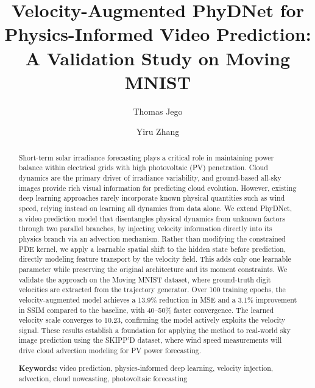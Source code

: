 \documentclass[11pt,a4paper]{article}
\title{\textbf{Velocity-Augmented PhyDNet for Physics-Informed Video Prediction:\\A Validation Study on Moving MNIST}}
\author[1]{Thomas Jego}
\author[2]{Yiru Zhang}
\affil[1]{Affiliation of Thomas Jego}
\affil[2]{Affiliation of Yiru Zhang}
\date{}
\begin{document}
\maketitle

\begin{abstract}
\noindent
Short-term solar irradiance forecasting plays a critical role in maintaining power balance within electrical grids with high photovoltaic (PV) penetration. Cloud dynamics are the primary driver of irradiance variability, and ground-based all-sky images provide rich visual information for predicting cloud evolution. However, existing deep learning approaches rarely incorporate known physical quantities such as wind speed, relying instead on learning all dynamics from data alone. We extend PhyDNet, a video prediction model that disentangles physical dynamics from unknown factors through two parallel branches, by injecting velocity information directly into its physics branch via an advection mechanism. Rather than modifying the constrained PDE kernel, we apply a learnable spatial shift to the hidden state before prediction, directly modeling feature transport by the velocity field. This adds only one learnable parameter while preserving the original architecture and its moment constraints. We validate the approach on the Moving MNIST dataset, where ground-truth digit velocities are extracted from the trajectory generator. Over 100 training epochs, the velocity-augmented model achieves a 13.9\% reduction in MSE and a 3.1\% improvement in SSIM compared to the baseline, with 40--50\% faster convergence. The learned velocity scale converges to 10.23, confirming the model actively exploits the velocity signal. These results establish a foundation for applying the method to real-world sky image prediction using the SKIPP'D dataset, where wind speed measurements will drive cloud advection modeling for PV power forecasting.

\medskip
\noindent\textbf{Keywords:} video prediction, physics-informed deep learning, velocity injection, advection, cloud nowcasting, photovoltaic forecasting
\end{abstract}
\end{document}
